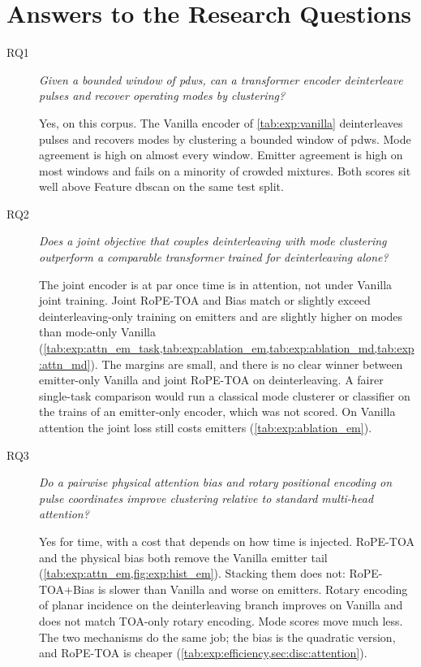 \section{Answers to the Research Questions}\label{sec:concl:answers}

\begin{description}
  \item[RQ1]
  \emph{Given a bounded window of \glspl{pdw}, can a transformer encoder deinterleave pulses and recover operating modes by clustering?}

  Yes, on this corpus.
  The Vanilla encoder of \cref{tab:exp:vanilla} deinterleaves pulses and recovers modes by clustering a bounded window of \glspl{pdw}.
  Mode agreement is high on almost every window. Emitter agreement is high on most windows and fails on a minority of crowded mixtures.
  Both scores sit well above Feature \gls{dbscan} on the same test split.

  \item[RQ2]
  \emph{Does a joint objective that couples deinterleaving with mode clustering outperform a comparable transformer trained for deinterleaving alone?}

  The joint encoder is at par once time is in attention, not under Vanilla joint training.
  Joint RoPE-TOA and Bias match or slightly exceed deinterleaving-only training on emitters and are slightly higher on modes than mode-only Vanilla (\cref{tab:exp:attn_em_task,tab:exp:ablation_em,tab:exp:ablation_md,tab:exp:attn_md}).
  The margins are small, and there is no clear winner between emitter-only Vanilla and joint RoPE-TOA on deinterleaving.
  A fairer single-task comparison would run a classical mode clusterer or classifier on the trains of an emitter-only encoder, which was not scored.
  On Vanilla attention the joint loss still costs emitters (\cref{tab:exp:ablation_em}).

  \item[RQ3]
  \emph{Do a pairwise physical attention bias and rotary positional encoding on pulse coordinates improve clustering relative to standard multi-head attention?}

  Yes for time, with a cost that depends on how time is injected.
  RoPE-TOA and the physical bias both remove the Vanilla emitter tail (\cref{tab:exp:attn_em,fig:exp:hist_em}).
  Stacking them does not: RoPE-TOA+Bias is slower than Vanilla and worse on emitters.
  Rotary encoding of planar incidence on the deinterleaving branch improves on Vanilla and does not match TOA-only rotary encoding.
  Mode scores move much less.
  The two mechanisms do the same job; the bias is the quadratic version, and RoPE-TOA is cheaper (\cref{tab:exp:efficiency,sec:disc:attention}).
\end{description}
